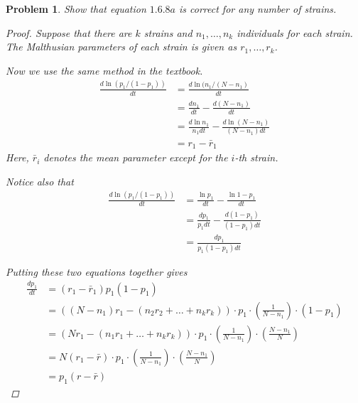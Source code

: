 \documentclass[12pt]{report}
\newtheorem{problem}{Problem}[chapter]
\begin{document}
        \begin{problem}
            Show that equation $1.6.8a$ is correct for any number of strains.
            \begin{proof}
                Suppose that there are $k$ strains and $n_1, \ldots, n_k$ individuals for each strain. The Malthusian parameters of each strain is given as $r_1, \ldots, r_k$.

                Now we use the same method in the textbook.
                \begin{equation*}
                    \begin{split}
                        \frac{d \ln(p_1/(1-p_1))}{dt}
                        &= \frac{d \ln(n_1/(N-n_1)}{dt}  \\
                        &= \frac{d n_1}{dt} - \frac{d (N-n_1)}{dt} \\
                        &= \frac{d \ln{n_1}}{n_1 dt} - \frac{d \ln(N-n_1)}{(N-n_1) dt} \\
                        &= r_1 - \bar{r}_1
                    \end{split}
                \end{equation*}
                Here, $\bar{r}_i$ denotes the mean parameter except for the $i$-th strain. 

                Notice also that
                \begin{equation*}
                    \begin{split}
                        \frac{d \ln(p_1/(1-p_1))}{dt}
                        &= \frac{\ln{p_1}}{dt} - \frac{\ln{1-p_1}}{dt} \\
                        &= \frac{d p_1}{p_1 dt} - \frac{d (1-p_1)}{(1-p_1)dt} \\
                        & = \frac{dp_1}{p_1(1-p_1)dt}
                    \end{split}
                \end{equation*}

                Putting these two equations together gives
                \begin{equation*}
                    \begin{split}
                        \frac{dp_1}{dt} 
                        &= (r_1-\bar{r}_1)p_1(1-p_1) \\
                        &= ((N-n_1)r_1 - (n_2r_2 + \ldots + n_kr_k)) \cdot p_1 \cdot
                        \left(\frac{1}{N-n_1}\right) \cdot (1-p_1) \\
                        &= (Nr_1 - (n_1r_1 + \ldots + n_kr_k)) \cdot p_1 \cdot
                        \left(\frac{1}{N-n_1}\right) \cdot 
                        \left(\frac{N-n_1}{N}\right) \\
                        &= N(r_1 - \bar{r}) \cdot p_1 \cdot
                        \left(\frac{1}{N-n_1}\right) \cdot 
                        \left(\frac{N-n_1}{N}\right) \\
                        &= p_1(r-\bar{r})
                    \end{split}
                \end{equation*}
            \end{proof}



\end{problem}
\end{document}
